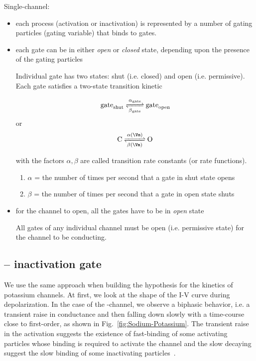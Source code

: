 Single-channel:
\begin{itemize}
  \item each process (activation or inactivation) is represented by a number of
  gating particles (gating variable) that binds to gates.
  
  \item each gate can be in either {\it open} or {\it closed} state, depending
  upon the presence of the gating particles
  
Individual gate has two states: shut (i.e. closed) and
open (i.e. permissive). Each gate satisfies a two-state transition kinetic

\begin{equation}
\gate_\shut \ce{<=>[\alpha_\gate][\beta_\gate]} \gate_\open
\end{equation}
or 
\begin{equation}
\ce{C <=>[\alpha(\Vm)][\beta(\Vm)] O}
\end{equation}

with the factors $\alpha, \beta$ are called transition rate constants (or rate
functions).

\begin{enumerate}
  \item $\alpha$ = the number of times per second that a gate in shut state
  opens

  \item $\beta$ = the number of times per second that a gate in open state shuts
\end{enumerate}

  \item for the channel to open, all the gates have to be in {\it open} state
  
All gates of any individual channel must be open (i.e. permissive state) for the
channel to be conducting. 
\end{itemize}

\subsection{-- inactivation gate}


We use the same approach when building the hypothesis for the kinetics of
potassium channels. At first, we look at the shape of the I-V curve during
depolarization. In the case of the -channel, we observe a biphasic
behavior, i.e. a transient raise in conductance and then falling down slowly
with a time-course close to first-order, as shown in
Fig.~\ref{fig:Sodium-Potassium}.  The transient raise in the activation suggests
the existence of fast-binding of some activating particles whose binding is
required to activate the channel and the slow decaying suggest the slow binding
of some inactivating particles~\citep{hodgkin1990qdm}.


